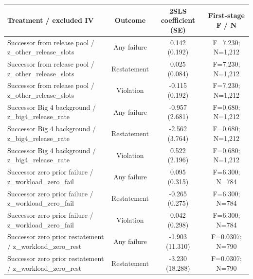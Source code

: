 \documentclass[10pt]{article}
\begin{document}
\begin{minipage}{19cm}\fontsize{10}{12}\selectfont\setlength{\tabcolsep}{4pt}\renewcommand{\arraystretch}{1.12}


\centering
{}
\begin{threeparttable}
\begin{tabular}{p{}ccc}
\toprule
Treatment / excluded IV & Outcome & 2SLS coefficient (SE) & First-stage F / N \\
\midrule
Successor from release pool / z\_other\_release\_slots & Any failure & \shortstack{0.142\\(0.192)} & F=7.230; N=1,212 \\
Successor from release pool / z\_other\_release\_slots & Restatement & \shortstack{0.025\\(0.084)} & F=7.230; N=1,212 \\
Successor from release pool / z\_other\_release\_slots & Violation & \shortstack{-0.115\\(0.192)} & F=7.230; N=1,212 \\
Successor Big 4 background / z\_big4\_release\_rate & Any failure & \shortstack{-0.957\\(2.681)} & F=0.680; N=1,212 \\
Successor Big 4 background / z\_big4\_release\_rate & Restatement & \shortstack{-2.562\\(3.764)} & F=0.680; N=1,212 \\
Successor Big 4 background / z\_big4\_release\_rate & Violation & \shortstack{0.522\\(2.196)} & F=0.680; N=1,212 \\
Successor zero prior failure / z\_workload\_zero\_fail & Any failure & \shortstack{0.095\\(0.315)} & F=6.300; N=784 \\
Successor zero prior failure / z\_workload\_zero\_fail & Restatement & \shortstack{-0.265\\(0.275)} & F=6.300; N=784 \\
Successor zero prior failure / z\_workload\_zero\_fail & Violation & \shortstack{0.042\\(0.298)} & F=6.300; N=784 \\
Successor zero prior restatement / z\_workload\_zero\_rest & Any failure & \shortstack{-1.903\\(11.310)} & F=0.0307; N=790 \\
Successor zero prior restatement / z\_workload\_zero\_rest & Restatement & \shortstack{-3.230\\(18.288)} & F=0.0307; N=790 \\

\end{tabular}
\end{threeparttable}
\end{minipage}
\end{document}
